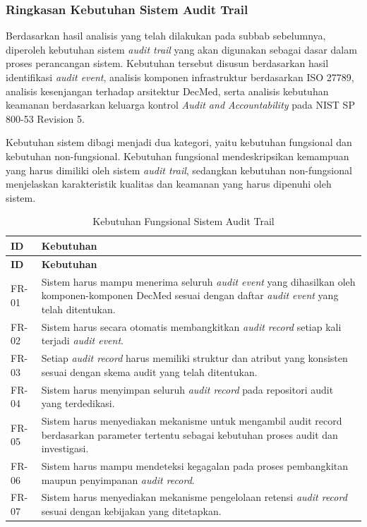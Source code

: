 \subsubsection{Ringkasan Kebutuhan Sistem Audit Trail}

Berdasarkan hasil analisis yang telah dilakukan pada subbab sebelumnya, diperoleh kebutuhan sistem \textit{audit trail} yang akan digunakan sebagai dasar dalam proses perancangan sistem. Kebutuhan tersebut disusun berdasarkan hasil identifikasi \textit{audit event}, analisis komponen infrastruktur berdasarkan ISO 27789, analisis kesenjangan terhadap arsitektur DecMed, serta analisis kebutuhan keamanan berdasarkan keluarga kontrol \textit{Audit and Accountability} pada NIST SP 800-53 Revision 5.

Kebutuhan sistem dibagi menjadi dua kategori, yaitu kebutuhan fungsional dan kebutuhan non-fungsional. Kebutuhan fungsional mendeskripsikan kemampuan yang harus dimiliki oleh sistem \textit{audit trail}, sedangkan kebutuhan non-fungsional menjelaskan karakteristik kualitas dan keamanan yang harus dipenuhi oleh sistem.

\begin{xltabular}{\textwidth}{|p{2cm}|X|}
\caption{Kebutuhan Fungsional Sistem Audit Trail}
\label{tab:kebutuhan_fungsional}\\

\hline
\textbf{ID} & \textbf{Kebutuhan}\\
\hline
\endfirsthead

\hline
\textbf{ID} & \textbf{Kebutuhan}\\
\hline
\endhead

\hline
\endfoot

FR-01 &
Sistem harus mampu menerima seluruh \textit{audit event} yang dihasilkan oleh komponen-komponen DecMed sesuai dengan daftar \textit{audit event} yang telah ditentukan.\\
\hline

FR-02 &
Sistem harus secara otomatis membangkitkan \textit{audit record} setiap kali terjadi \textit{audit event}.\\
\hline

FR-03 &
Setiap \textit{audit record} harus memiliki struktur dan atribut yang konsisten sesuai dengan skema audit yang telah ditentukan.\\
\hline

FR-04 &
Sistem harus menyimpan seluruh \textit{audit record} pada repositori audit yang terdedikasi.\\
\hline

FR-05 &
Sistem harus menyediakan mekanisme untuk mengambil audit record berdasarkan parameter tertentu sebagai kebutuhan proses audit dan investigasi.\\
\hline

FR-06 &
Sistem harus mampu mendeteksi kegagalan pada proses pembangkitan maupun penyimpanan \textit{audit record}.\\
\hline

FR-07 &
Sistem harus menyediakan mekanisme pengelolaan retensi \textit{audit record} sesuai dengan kebijakan yang ditetapkan.\\
\hline

\end{xltabular}

